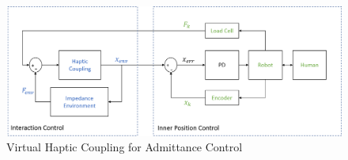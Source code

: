 \documentclass[12pt]{report}
\begin{document}
	
	
	
	


	
%


	
		\begin{figure}[h] 
		\centering
		\includegraphics[width=\linewidth]{control_diagram3}
		\caption{Virtual Haptic Coupling for Admittance Control}
		\label{fig:software}
	\end{figure} 
	
\end{document}
